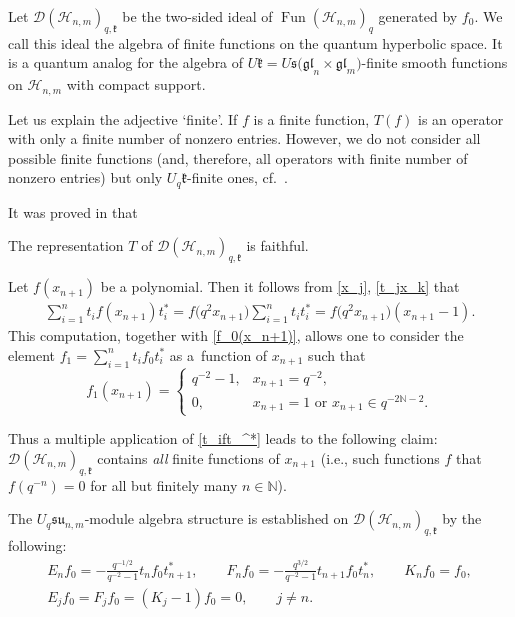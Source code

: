 Let $\mathscr{D}(\mathscr{H}_{n,m})_{q,\mathfrak{k}}$ be the two-sided ideal of
$\operatorname{Fun}(\mathscr{H}_{n,m})_q$ generated by $f_0$. We call this ideal the algebra of f\/inite
functions on the quantum hyperbolic space. It is a quantum analog for the algebra of $U \mathfrak{k}=U
\mathfrak{s(gl}_n \times \mathfrak{gl}_m)$-f\/inite smooth functions on $\mathscr{H}_{n,m}$ with compact
support.

\begin{remark}
Let us explain the adjective `f\/inite'. If $f$ is a f\/inite function, $T(f)$ is an operator with only a f\/inite
number of nonzero entries. However, we do not consider all possible f\/inite functions (and, therefore, all
operators with f\/inite number of nonzero entries) but only $U_q \mathfrak{k}$-f\/inite ones, cf.~\cite{Faraut}.
\end{remark}

It was proved in \cite{BS} that

\begin{theorem}
The representation $T$ of $\mathscr{D}(\mathscr{H}_{n,m})_{q,\mathfrak{k}}$ is faithful.
\end{theorem}

\begin{remark}\label{remark2}
Let $f(x_{n+1})$ be a polynomial. Then it follows from \eqref{x_j}, \eqref{t_jx_k} that
\begin{gather}\label{t_ift_^*}
\sum_{i=1}^nt_if(x_{n+1})t_i^*=f\big(q^2x_{n+1}\big)\sum_{i=1}^nt_it_i^*= f\big(q^2x_{n+1}\big)(x_{n+1}-1).
\end{gather}
This computation, together with \eqref{f_0(x_n+1)}, allows one to consider the element
$f_1=\sum\limits_{i=1}^nt_if_0t_i^*$ as a~function of $x_{n+1}$ such that
\[
f_1(x_{n+1})=
\begin{cases}
q^{-2}-1, & x_{n+1}=q^{-2},
\\ 0, & x_{n+1}=1\text{ \ or \ }x_{n+1}\in q^{-2\mathbb{N}-2}.
\end{cases}
\]

Thus a multiple application of \eqref{t_ift_^*} leads to the following claim:
$\mathscr{D}(\mathscr{H}_{n,m})_{q,\mathfrak{k}}$ contains {\it all} f\/inite functions of $x_{n+1}$ (i.e.,
such functions $f$ that $f(q^{-n})=0$ for all but f\/initely many $n\in\mathbb{N}$).
\end{remark}

The $U_{q}\mathfrak{su}_{n,m}$-module algebra structure is established on
$\mathscr{D}(\mathscr{H}_{n,m})_{q,\mathfrak{k}}$ by the following:
\begin{gather*}
E_nf_0 = -\frac{q^{-1/2}}{q^{-2}-1}t_nf_0t_{n+1}^*, \qquad F_nf_0 = -\frac{q^{3/2}}{q^{-2}-1}t_{n+1}f_0t_n^*,
\qquad K_nf_0 = f_0,
\\
E_jf_0 = F_jf_0=(K_j-1)f_0=0,\qquad j\ne n.
\end{gather*}



